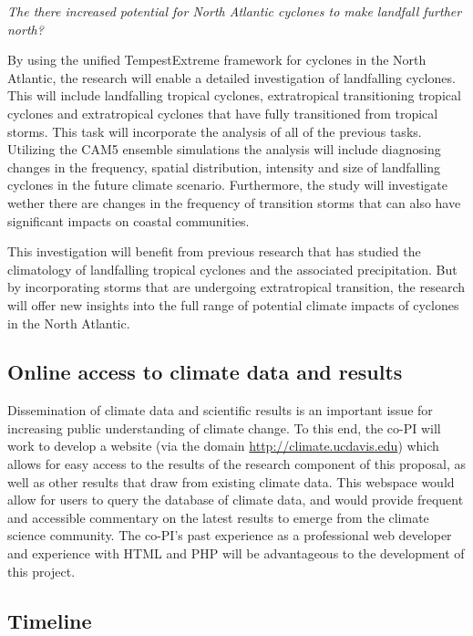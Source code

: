\documentclass[11pt]{article}
\begin{document}
\emph{The there increased potential for North Atlantic cyclones to make landfall further north?}

By using the unified TempestExtreme framework for cyclones in the North Atlantic, the research will enable a detailed investigation of landfalling cyclones.  This will include landfalling tropical cyclones, extratropical transitioning tropical cyclones and extratropical cyclones that have fully transitioned from tropical storms. This task will incorporate the analysis of all of the previous tasks. Utilizing the CAM5 ensemble simulations the analysis will include diagnosing changes in the frequency, spatial distribution, intensity and size of landfalling cyclones in the future climate scenario.  Furthermore, the study will investigate wether there are changes in the frequency of transition storms that can also have significant impacts on coastal communities.

This investigation will benefit from previous research that has studied the climatology of landfalling tropical cyclones and the associated precipitation. But by incorporating storms that are undergoing extratropical transition, the research will offer new insights into the full range of potential climate impacts of cyclones in the North Atlantic. 

\subsection{Online access to climate data and results}

Dissemination of climate data and scientific results is an important issue for increasing public understanding of climate change.  To this end, the co-PI will work to develop a website (via the domain \url{http://climate.ucdavis.edu}) which allows for easy access to the results of the research component of this proposal, as well as other results that draw from existing climate data.  This webspace would allow for users to query the database of climate data, and would provide frequent and accessible commentary on the latest results to emerge from the climate science community.  The co-PI's past experience as a professional web developer and experience with HTML and PHP will be advantageous to the development of this project.

\subsection{Timeline} \label{sec:Timeline}
\end{document}
